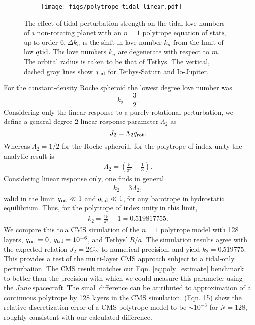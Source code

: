\begin{figure}[h]  
  \centering
    \texttt{[image: figs/polytrope\_tidal\_linear.pdf]}
\caption{ The effect of tidal perturbation strength on the tidal love numbers of a
    non-rotating planet with an $n=1$ polytrope equation of state, up to order 6.
    $\Delta k_n$ is the shift in love number $k_n$ from the limit of low $q{\rm
    tid}$. The love numbers $k_n$ are degenerate with respect to $m$. The orbital
    radius is taken to be that of Tethys. The vertical, dashed gray lines show $q_{\rm tid}$
    for Tethys-Saturn and Io-Jupiter.}
\label{fig:polytrope_tidal_only}
\end{figure}

For the constant-density Roche spheroid the lowest degree love number was 
%
\begin{equation}
    k_2 = \frac{3}{2}.
\end{equation}
% 
Considering only the linear response to a purely rotational perturbation, we define a
general degree 2 linear response parameter $\Lambda_2$ as 
%
\begin{equation}
    J_2 = \Lambda_2 q_{\rm rot}.
    \label{eq:linear_response}
\end{equation}
%
Whereas $\Lambda_2=1/2$ for the Roche spheroid, for the polytrope of index unity
the analytic result is \citep{hubbard1975} 
%
\begin{equation}
\begin{aligned}
    \Lambda_2 = \left( \frac{5}{\pi^2} - \frac{1}{3} \right).
\end{aligned}
\end{equation}
%
Considering linear response only, one finds in general
%
\begin{equation}
\begin{aligned}
    k_2 = 3 \Lambda_2 ,
\end{aligned}
 \label{eq:k2_lambda2}
\end{equation}
%
valid in the limit $q_{\rm rot} \ll 1$ and $q_{\rm tid} \ll 1$, for any barotrope in
hydrostatic equilibrium.  Thus, for the polytrope of index unity in this limit,
%
\begin{equation}
\begin{aligned}
    k_2 = \frac{15}{\pi^2} - 1 = 0.519817755.
    \label{eq:poly_estimate}
\end{aligned}
\end{equation}
%
We compare this to a CMS simulation of the $n=1$ polytrope model with 128 layers,
$q_{\rm rot}=0$, $q_{\rm tid}=10^{-6}$, and Tethys' $R/a$. The simulation results
agree with the expected relation $J_2=2C_{22}$ to numerical precision, and yield
$k_2=0.519775$. This provides a test of the multi-layer CMS approach subject to a
tidal-only perturbation.  The CMS result matches our Eqn. \eqref{eq:poly_estimate}
benchmark to better than the precision with which we could measure this parameter
using the \textit{Juno} spacecraft.  The small difference can be attributed to
approximation of a continuous polytrope by 128 layers in the CMS simulation.
\citet{wisdom2016} (Eqn.  15) show the relative discretization error of a CMS
polytrope model to be $\sim 10^{-3}$ for $N=128$, roughly consistent with our
calculated difference. 



